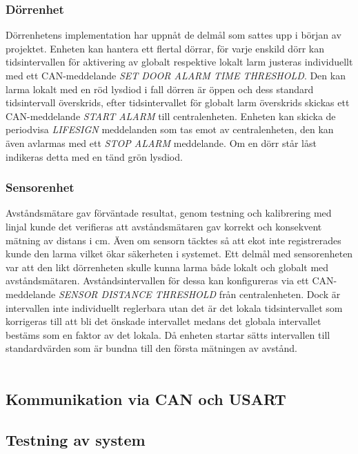 \documentclass{article}
\begin{document}
\subsubsection{Dörrenhet}
Dörrenhetens implementation har uppnåt de delmål som sattes upp i början av projektet. 
Enheten kan hantera ett flertal dörrar, för varje enskild dörr kan tidsintervallen för aktivering av globalt respektive lokalt larm justeras individuellt med ett CAN-meddelande \emph{SET DOOR ALARM TIME THRESHOLD}. 
Den kan larma lokalt med en röd lysdiod i fall dörren är öppen och dess standard tidsintervall överskrids, efter tidsintervallet för globalt larm överskrids skickas ett CAN-meddelande \emph{START ALARM} till centralenheten.
Enheten kan skicka de periodvisa \emph{LIFESIGN} meddelanden som tas emot av centralenheten, den kan även avlarmas med ett \emph{STOP ALARM} meddelande. Om en dörr står låst indikeras detta med en tänd grön lysdiod.

\subsubsection{Sensorenhet}
Avståndsmätare gav förväntade resultat, genom testning och kalibrering med linjal kunde det verifieras att avståndsmätaren gav korrekt och konsekvent mätning av distans i cm.
Även om sensorn täcktes så att ekot inte registrerades kunde den larma vilket ökar säkerheten i systemet. 
Ett delmål med sensorenheten var att den likt dörrenheten skulle kunna larma både lokalt och globalt med avståndsmätaren. 
Avståndsintervallen för dessa kan konfigureras via ett CAN-meddelande \emph{SENSOR DISTANCE THRESHOLD} från centralenheten. 
Dock är intervallen inte individuellt reglerbara utan det är det lokala tidsintervallet som korrigeras till att bli det önskade intervallet medans det globala intervallet bestäms som en faktor av det lokala. 
Då enheten startar sätts intervallen till standardvärden som är bundna till den första mätningen av avstånd.
\\
\\

\subsection{Kommunikation via CAN och USART}

\subsection{Testning av system}
\end{document}
